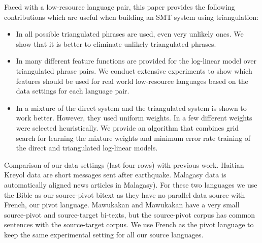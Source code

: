 \documentclass[11pt]{article}
\begin{document}
Faced with a low-resource language pair, this paper provides the following contributions which are useful when building an SMT system using triangulation: 
\begin{itemize}\addtolength{\itemsep}{-0.4\baselineskip}
	\item In \cite{Utiyama:07} all possible triangulated phrases are used, even very unlikely ones. We show that it is better to eliminate unlikely triangulated phrases.
	\item In \cite{Utiyama:07,Cohn:07,Nakovemnlp:12,Ahmed:13,Wu:09,Nicola:08} many different feature functions are provided for the log-linear model over triangulated phrase pairs. We conduct extensive experiments to show which features should be used for real world low-resource languages based on the data settings for each language pair.
	\item In \cite{Cohn:07} a mixture of the direct system and the triangulated system is shown to work better. However, they used uniform weights. In \cite{Nakovemnlp:12} a few different weights were selected heuristically. We provide an algorithm that combines grid search for learning the mixture weights and minimum error rate training of the direct and triangulated log-linear models. 
\end{itemize}

\begin{table}[!ht]
	\footnotesize
	\small
	\centering
	
	\caption{Comparison of our data settings (last four rows) with previous work. Haitian Kreyol data are short messages sent after earthquake. Malagasy data is automatically aligned news articles in Malagasy). For these two languages we use the Bible as our source-pivot bitext as they have no parallel data source with French, our pivot language. Mawukakan and Mawukakan have a very small source-pivot and source-target bi-texts, but the source-pivot corpus has common sentences with the source-target corpus. We use French as the pivot language to keep the same experimental setting for all our source languages.}
	\label{table:datasettings_differences}
\end{table}

	
\end{document}
